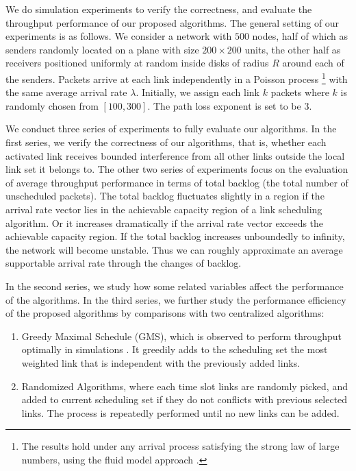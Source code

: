 \documentclass[journal]{IEEEtran}
\begin{document}
We do simulation experiments to verify the correctness, and evaluate the throughput performance of our proposed algorithms.
The general setting of our experiments is as follows. We consider a network with $500$ nodes, half of which as senders randomly located on a plane with size $200\times 200$ units, the other half as receivers positioned uniformly at random
inside disks of radius $R$ around each of the senders. Packets arrive at each link independently in a Poisson process \footnote{The results hold under any arrival process satisfying the strong law of large numbers, using the fluid model approach \cite{sha07} \cite{S:pick3}.} with the same average arrival rate $\lambda $. Initially, we assign each link $k$ packets where $k$ is randomly chosen from $[100,300]$. The path loss exponent is set to be $3$.

We  conduct three series of experiments to fully evaluate our algorithms. In the first series, we verify the correctness of our algorithms, that is, whether each activated link receives bounded interference from all other links outside the local link set it belongs to. The other two series of experiments focus on the evaluation of average throughput performance in terms of total backlog (the total number of unscheduled packets).
The total backlog fluctuates slightly in a region if the arrival rate vector lies in the achievable capacity region of a link scheduling  algorithm. Or it increases dramatically if the arrival rate vector exceeds the achievable capacity region. If the total backlog increases unboundedly to infinity, the network will become unstable. Thus we can roughly approximate an average supportable arrival rate through the changes of backlog.

In the second series, we study how some related variables affect the performance of the algorithms.
In the third series, we further study the performance efficiency of the proposed algorithms by comparisons with two centralized algorithms:
\begin{enumerate}
  \item Greedy Maximal Schedule (GMS), which is observed to perform throughput optimally in simulations \cite{S:GMS}. It greedily adds to the scheduling set the most weighted link that is independent with the previously added links.
  \item Randomized Algorithms, where each time slot links are randomly picked, and added to current scheduling set if they do not conflicts with previous selected links. The process is repeatedly performed until no new links can be added.
\end{enumerate}
\end{document}
